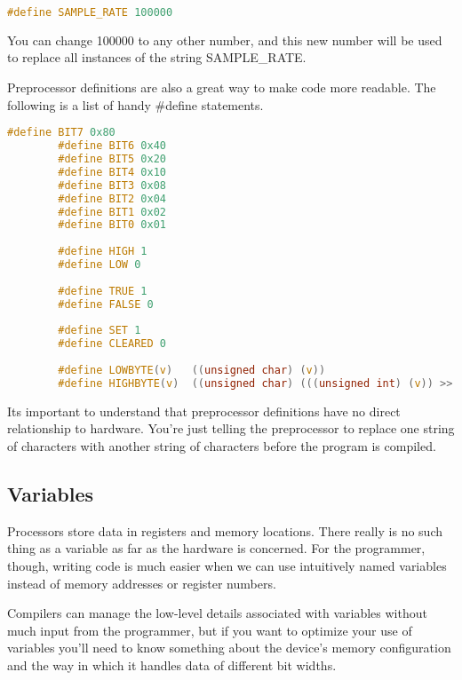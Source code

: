         \begin{lstlisting}[backgroundcolor = \color{lightgray}, language=c]
            #define SAMPLE_RATE 100000
        \end{lstlisting}
        
    You can change 100000 to any other number, and this new number will be used to replace all instances of the string SAMPLE\_RATE.

    Preprocessor definitions are also a great way to make code more readable. The following is a list of handy \#define statements.
     
        \begin{lstlisting}[backgroundcolor = \color{lightgray}, language=c]
        #define BIT7 0x80
        #define BIT6 0x40
        #define BIT5 0x20
        #define BIT4 0x10
        #define BIT3 0x08
        #define BIT2 0x04
        #define BIT1 0x02 
        #define BIT0 0x01
        
        #define HIGH 1
        #define LOW 0
        
        #define TRUE 1
        #define FALSE 0
        
        #define SET 1
        #define CLEARED 0
        
        #define LOWBYTE(v)   ((unsigned char) (v))
        #define HIGHBYTE(v)  ((unsigned char) (((unsigned int) (v)) >> 8))
        \end{lstlisting}

    Its important to understand that preprocessor definitions have no direct relationship to hardware. You’re just telling the preprocessor to replace one string of characters with another string of characters before the program is compiled.
    
        \subsection{Variables}
            Processors store data in registers and memory locations. There really is no such thing as a variable as far as the hardware is concerned. For the programmer, though, writing code is much easier when we can use intuitively named variables instead of memory addresses or register numbers.
            
            Compilers can manage the low-level details associated with variables without much input from the programmer, but if you want to optimize your use of variables you'll need to know something about the device’s memory configuration and the way in which it handles data of different bit widths.
            
